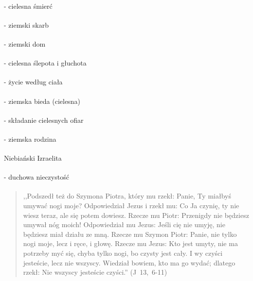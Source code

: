 \documentclass[10pt,a4paper,oneside]{article}
\begin{document}
\paragraph{}
- cielesna śmierć
\paragraph{}
- ziemski skarb
\paragraph{}
- ziemski dom
\paragraph{}
- cielesna ślepota i głuchota
\paragraph{}
- życie według ciała
\paragraph{}
- ziemska bieda (cielesna)
\paragraph{}
- składanie cielesnych ofiar
\paragraph{}
- ziemska rodzina
\paragraph{}
Niebiański Izraelita
\paragraph{}
- duchowa nieczystość
\paragraph{}
\begin{quote}
,,Podszedł też do Szymona Piotra, który mu rzekł: Panie, Ty miałbyś umywać nogi moje? Odpowiedział Jezus i rzekł mu: Co Ja czynię, ty nie wiesz teraz, ale się potem dowiesz. Rzecze mu Piotr: Przenigdy nie będziesz umywał nóg moich! Odpowiedział mu Jezus: Jeśli cię nie umyję, nie będziesz miał działu ze mną. Rzecze mu Szymon Piotr: Panie, nie tylko nogi moje, lecz i ręce, i głowę. Rzecze mu Jezus: Kto jest umyty, nie ma potrzeby myć się, chyba tylko nogi, bo czysty jest cały. I wy czyści jesteście, lecz nie wszyscy. Wiedział bowiem, kto ma go wydać; dlatego rzekł: Nie wszyscy jesteście czyści.'' \mbox{(J 13, 6-11)}
\end{quote}
\end{document}
